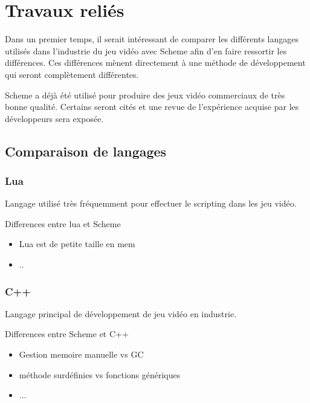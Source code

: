 \documentclass[12pt,oneside,letterpaper,francais]{book}
\begin{document}

\chapter{Travaux reliés}

Dans un premier temps, il serait intéressant de comparer les
différents langages utilisés dans l'industrie du jeu vidéo avec Scheme
afin d'en faire ressortir les différences. Ces différences mènent
directement à une méthode de développement qui seront complètement
différentes.

Scheme a déjà été utilisé pour produire des jeux vidéo commerciaux de
très bonne qualité. Certains seront cités et une revue de l'expérience
acquise par les développeurs sera exposée.

\section{Comparaison de langages}

\subsection{Lua}
Langage utilisé très fréquemment pour effectuer le \og scripting \fg
dans les jeu vidéo.

Differences entre lua et Scheme
\begin{itemize}
\item Lua est de petite taille en mem
\item ..
\end{itemize}

\subsection{C++}
Langage principal de développement de jeu vidéo en industrie.

Differences entre Scheme et C++
\begin{itemize}
\item Gestion memoire manuelle vs GC
\item méthode surdéfinies vs fonctions génériques
\item ...
\end{itemize}
\end{document}
